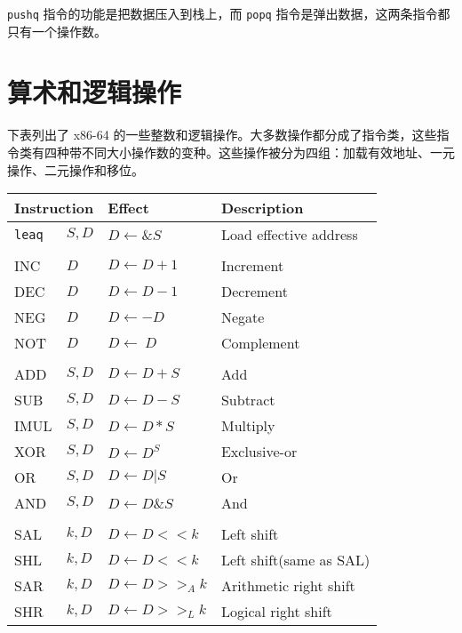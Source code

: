 \verb|pushq| 指令的功能是把数据压入到栈上，而 \verb|popq| 指令是弹出数据，这两条指令都只有一个操作数。

\section{算术和逻辑操作}

下表列出了 x86-64 的一些整数和逻辑操作。大多数操作都分成了指令类，这些指令类有四种带不同大小操作数的变种。这些操作被分为四组：加载有效地址、一元操作、二元操作和移位。

\begin{table}[!ht]
    \centering
    \begin{tabular}{llll}
        \toprule
        \multicolumn{2}{l}{Instruction} & Effect & Description \\
        \midrule
        \texttt{leaq} & $S, D$ & $D \leftarrow \&S$ & Load effective address \\
        \\
        INC  & $D$    & $D \leftarrow D + 1$    & Increment \\
        DEC  & $D$    & $D \leftarrow D - 1$    & Decrement \\
        NEG  & $D$    & $D \leftarrow -D$       & Negate \\
        NOT  & $D$    & $D \leftarrow ~D$       & Complement \\
        \\
        ADD  & $S, D$ & $D \leftarrow D + S$  & Add \\
        SUB  & $S, D$ & $D \leftarrow D - S$  & Subtract \\
        IMUL & $S, D$ & $D \leftarrow D * S$  & Multiply \\
        XOR  & $S, D$ & $D \leftarrow D ^ S$  & Exclusive-or \\
        OR   & $S, D$ & $D \leftarrow D | S$  & Or \\
        AND  & $S, D$ & $D \leftarrow D \& S$ & And \\
        \\
        SAL  & $k, D$ & $D \leftarrow D << k$ & Left shift \\
        SHL  & $k, D$ & $D \leftarrow D << k$ & Left shift(same as SAL) \\
        SAR  & $k, D$ & $D \leftarrow D >>_A k$ & Arithmetic right shift \\
        SHR  & $k, D$ & $D \leftarrow D >>_L k$ & Logical right shift \\
        \bottomrule
    \end{tabular}
\end{table}

